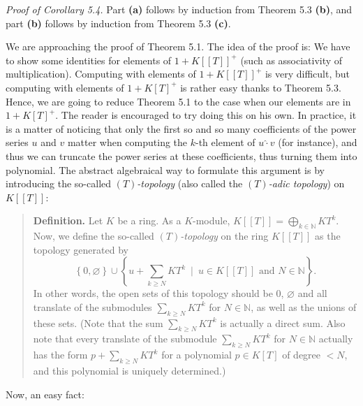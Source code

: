 \documentclass[12pt,final,notitlepage,onecolumn,german]{article}%
\begin{document}
\textit{Proof of Corollary 5.4.} Part \textbf{(a)} follows by induction from
Theorem 5.3 \textbf{(b)}, and part \textbf{(b)} follows by induction from
Theorem 5.3 \textbf{(c)}.

We are approaching the proof of Theorem 5.1. The idea of the proof is: We have
to show some identities for elements of $1+K\left[  \left[  T\right]  \right]
^{+}$ (such as associativity of multiplication). Computing with elements of
$1+K\left[  \left[  T\right]  \right]  ^{+}$ is very difficult, but computing
with elements of $1+K\left[  T\right]  ^{+}$ is rather easy thanks to Theorem
5.3. Hence, we are going to reduce Theorem 5.1 to the case when our elements
are in $1+K\left[  T\right]  ^{+}$. The reader is encouraged to try doing this
on his own. In practice, it is a matter of noticing that only the first so and
so many coefficients of the power series $u$ and $v$ matter when computing the
$k$-th element of $u\widehat{\cdot}v$ (for instance), and thus we can truncate
the power series at these coefficients, thus turning them into polynomial. The
abstract algebraical way to formulate this argument is by introducing the
so-called $\left(  T\right)  $\textit{-topology} (also called the $\left(
T\right)  $\textit{-adic topology}) on $K\left[  \left[  T\right]  \right]  $:

\begin{quote}
\textbf{Definition.} Let $K$ be a ring. As a $K$-module, $K\left[  \left[
T\right]  \right]  =\bigoplus\limits_{k\in\mathbb{N}}KT^{k}$. Now, we define
the so-called $\left(  T\right)  $\textit{-topology} on the ring $K\left[
\left[  T\right]  \right]  $ as the topology generated by%
\[
\left\{  0,\varnothing\right\}  \cup\left\{  u+\sum_{k\geq N}KT^{k}%
\ \mid\ u\in K\left[  \left[  T\right]  \right]  \text{ and }N\in
\mathbb{N}\right\}  .
\]
In other words, the open sets of this topology should be $0$, $\varnothing$
and all translate of the submodules $\sum\limits_{k\geq N}KT^{k}$ for
$N\in\mathbb{N}$, as well as the unions of these sets. (Note that the sum
$\sum\limits_{k\geq N}KT^{k}$ is actually a direct sum. Also note that every
translate of the submodule $\sum\limits_{k\geq N}KT^{k}$ for $N\in\mathbb{N}$
actually has the form $p+\sum\limits_{k\geq N}KT^{k}$ for a polynomial $p\in
K\left[  T\right]  $ of degree $<N$, and this polynomial is uniquely determined.)
\end{quote}

Now, an easy fact:
\end{document}
